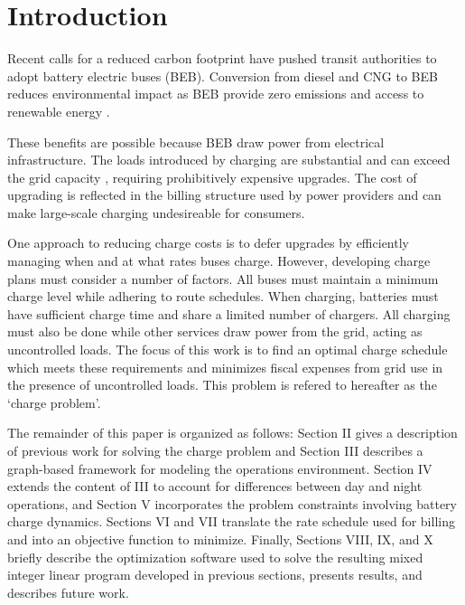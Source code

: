 \section{Introduction}
Recent calls for a reduced carbon footprint have pushed transit authorities to adopt battery electric buses (BEB). Conversion from diesel and CNG to BEB reduces environmental impact as BEB provide zero emissions and access to renewable energy \cite{poornesh_comparative_2020}. 
\par These benefits are possible because BEB draw power from electrical infrastructure. The loads introduced by charging are substantial and can exceed the grid capacity \cite{stahleder_impact_2019}\cite{deb_impact_2017}\cite{boonraksa_impact_2019}, requiring prohibitively expensive upgrades. The cost of upgrading is reflected in the billing structure used by power providers and can make large-scale charging undesireable for consumers. 
\par One approach to reducing charge costs is to defer upgrades by efficiently managing when and at what rates buses charge. However, developing charge plans must consider a number of factors. All buses must maintain a minimum charge level while adhering to route schedules. When charging, batteries must have sufficient charge time and share a limited number of chargers. All charging must also be done while other services draw power from the grid, acting as uncontrolled loads. The focus of this work is to find an optimal charge schedule which meets these requirements and minimizes fiscal expenses from grid use in the presence of uncontrolled loads. This problem is refered to hereafter as the `charge problem'.  
\par The remainder of this paper is organized as follows: Section II gives a description of previous work for solving the charge problem and Section III describes a graph-based framework for modeling the operations environment.  Section IV extends the content of III to account for differences between day and night operations, and Section V incorporates the problem constraints involving battery charge dynamics.  Sections VI and VII translate the rate schedule used for billing and into an objective function to minimize. Finally, Sections VIII, IX, and X briefly describe the optimization software used to solve the resulting mixed integer linear program developed in previous sections, presents results, and describes future work.
